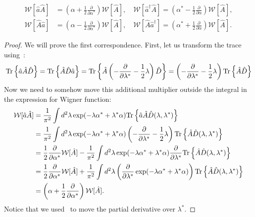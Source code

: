\begin{theorem}
\label{thm:formalism:sm-wigner:correspondences}
\begin{equation*}
\begin{split}
	\mathcal{W} [ \hat{a} \hat{A} ]
		& = \left( \alpha + \frac{1}{2} \frac{\partial}{\partial \alpha^*} \right) \mathcal{W}[\hat{A}],
	\quad
	\mathcal{W} [ \hat{a}^\dagger \hat{A} ]
		= \left( \alpha^* - \frac{1}{2} \frac{\partial}{\partial \alpha} \right) \mathcal{W}[\hat{A}], \\
	\mathcal{W} [ \hat{A} \hat{a} ]
		& = \left( \alpha - \frac{1}{2} \frac{\partial}{\partial \alpha^*} \right) \mathcal{W}[\hat{A}],
	\quad
	\mathcal{W} [ \hat{A} \hat{a}^\dagger ]
		= \left( \alpha^* + \frac{1}{2} \frac{\partial}{\partial \alpha} \right) \mathcal{W}[\hat{A}].
\end{split}
\end{equation*}
\end{theorem}
\begin{proof}
We will prove the first correspondence.
First, let us transform the trace using~:
\begin{equation*}
\begin{split}
	\mathrm{Tr} \left\{  \hat{a} \hat{A} \hat{D}  \right\}
	= \mathrm{Tr} \left\{  \hat{A} \hat{D} \hat{a} \right\}
	= \mathrm{Tr} \left\{  \hat{A} \left(
		-\frac{\partial}{\partial \lambda^*}
		-\frac{1}{2} \lambda
	\right) \hat{D} \right\}
	= \left(
		-\frac{\partial}{\partial \lambda^*}
		-\frac{1}{2} \lambda
	\right) \mathrm{Tr} \left\{  \hat{A} \hat{D} \right\}
\end{split}
\end{equation*}
Now we need to somehow move this additional multiplier outside the integral in the expression for Wigner function:
\begin{equation*}
\begin{split}
	\mathcal{W} [ \hat{a} \hat{A} ]
	& = \frac{1}{\pi^2} \int d^2 \lambda \exp(-\lambda \alpha^* + \lambda^* \alpha)
		\mathrm{Tr} \left\{  \hat{a} \hat{A} \hat{D}(\lambda, \lambda^*)  \right\} \\
	& = \frac{1}{\pi^2} \int d^2 \lambda \exp(-\lambda \alpha^* + \lambda^* \alpha)
		\left(
			-\frac{\partial}{\partial \lambda^*}
			-\frac{1}{2} \lambda
		\right)
		\mathrm{Tr} \left\{  \hat{A} \hat{D}(\lambda, \lambda^*)  \right\} \\
	& = \frac{1}{2} \frac{\partial}{\partial \alpha^*} \mathcal{W} [\hat{A}]
	- \frac{1}{\pi^2} \int d^2 \lambda \exp(-\lambda \alpha^* + \lambda^* \alpha)
		\frac{\partial}{\partial \lambda^*}
		\mathrm{Tr} \left\{  \hat{A} \hat{D}(\lambda, \lambda^*)  \right\} \\
	& = \frac{1}{2} \frac{\partial}{\partial \alpha^*} \mathcal{W} [\hat{A}]
	+ \frac{1}{\pi^2} \int d^2 \lambda \left(
		\frac{\partial}{\partial \lambda^*} \exp(-\lambda \alpha^* + \lambda^* \alpha)
	\right)
	\mathrm{Tr} \left\{  \hat{A} \hat{D}(\lambda, \lambda^*)  \right\} \\
	& = \left( \alpha + \frac{1}{2} \frac{\partial}{\partial \alpha^*} \right) \mathcal{W} [\hat{A}].
\end{split}
\end{equation*}
Notice that we used~ to move the partial derivative over $\lambda^*$.
\end{proof}
